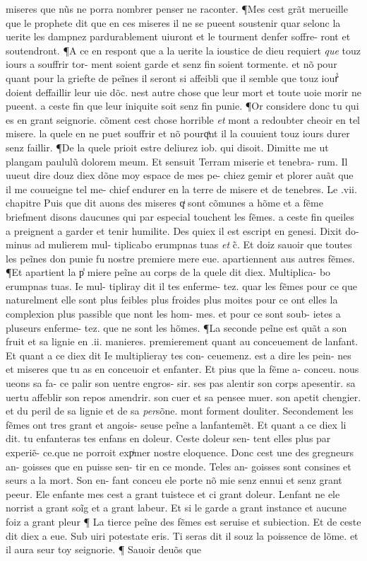 \documentclass{article}
\begin{document}
\begin{pages}
miseres que nũs ne porra nombrer penser ne raconter. ¶Mes cest grãt merueille que le prophete dit que en ces miseres il ne se pueent soustenir quar selonc la uerite les dampnez pardurablement uiuront et le tourment denfer soffre- ront et soutendront. ¶A ce en respont que a la uerite la ioustice de dieu requiert \textit{que} touz iours a souffrir tor- ment soient garde et senz fin soient tormente. et nõ pour quant pour la griefte de peĩnes il seront si affeibli que il semble que touz iourᷤ doient deffaillir leur uie dõc. nest autre chose que leur mort et toute uoie morir ne pueent. a ceste fin que leur iniquite soit senz fin punie. ¶Or considere donc tu qui es en grant seignorie. cõment cest chose horrible \textit{et} mont a redoubter cheoir en tel misere. la quele en ne puet souffrir et nõ pourqͣnt il la couuient touz iours durer senz faillir. ¶De la quele prioit estre deliurez iob. qui disoit. Dimitte me ut plangam paululũ dolorem meum. Et sensuit Terram miserie et tenebra- rum. Il uueut dire douz diex dõne moy espace de mes pe- chiez gemir et plorer auãt que il me couueigne tel me- chief endurer en la terre de misere et de tenebres. Le .vii. chapitre Puis que dit auons des miseres qͥ sont cõmunes a hõme et a fẽme briefment disons daucunes qui par especial touchent les fẽmes. a ceste fin queiles a preignent a garder et tenir humilite. Des quiex il est escript en genesi. Dixit do- minus ad mulierem mul- tiplicabo erumpnas tuas \textit{et} c̃. Et doiz sauoir que toutes les peĩnes don punie fu nostre premiere mere eue. apartiennent aus autres fẽmes. ¶Et apartient la p̾ miere peĩne au corps de la quele dit diex. Multiplica- bo erumpnas tuas. Ie mul- tipliray dit il tes enferme- tez. quar les fẽmes pour ce que naturelment elle sont plus feibles plus froides plus moites pour ce ont elles la complexion plus passible que nont les hom- mes. et pour ce sont soub- ietes a pluseurs enferme- tez. que ne sont les hõmes. ¶La seconde peĩne est quãt a son fruit et sa lignie en .ii. manieres. premierement quant au conceuement de lanfant. Et quant a ce diex dit Ie multiplieray tes con- ceuemenz. est a dire les pein- nes et miseres que tu as en conceuoir et enfanter. Et pius que la fẽme a- conceu. nous ueons sa fa- ce palir son uentre engros- sir. ses pas alentir son corps apesentir. sa uertu affeblir son repos amendrir. son cuer et sa pensee muer. son apetit chengier. et du peril de sa lignie et de sa \textit{per}sõne. mont forment douliter. Secondement les fẽmes ont tres grant et angois- seuse peĩne a lanfantemẽt. Et quant a ce diex li dit. tu enfanteras tes enfans en doleur. Ceste doleur sen- tent elles plus par experiẽ- ce.que ne porroit expͥmer nostre eloquence. Donc cest une des gregneurs an- goisses que en puisse sen- tir en ce monde. Teles an- goisses sont consines et seurs a la mort. Son en- fant conceu ele porte nõ mie senz ennui et senz grant peeur. Ele enfante mes cest a grant tuistece et ci grant doleur. Lenfant ne ele norrist a grant soĩg et a grant labeur. Et si le garde a grant instance et aucune foiz a grant pleur ¶ La tierce peĩne des fẽmes est seruise et subiection. Et de ceste dit diex a eue. Sub uiri potestate eris. Ti seras dit il souz la poissence de lõme. et il aura seur toy seignorie. ¶ Sauoir deuõs que 
\end{pages}
\end{document}
